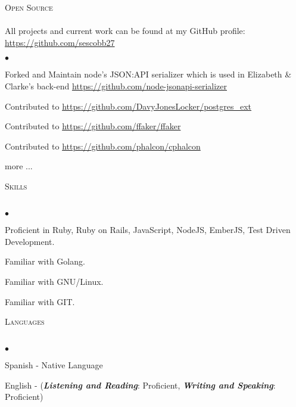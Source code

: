 \documentclass[a4paper]{article}
\newcommand{\lineunder}{\vspace*{-8pt} \\ \hspace*{-18pt} \hrulefill \\}
\newcommand{\header}[1]{{\hspace*{-15pt}\vspace*{6pt}
\textsc{#1}} \vspace*{-6pt} \lineunder}
\newenvironment{achievements}{\begin{list}{$\bullet$}{\topsep 0pt \itemsep
-2pt}}{\vspace*{4pt}\end{list}}
\newcommand{\programming}[1]{{\textbf{#1}}}
\newcommand{\emphasys}[1]{\textbf{\emph{#1}}}
\begin{document}

\header{Open Source}
All projects and current work can be found at my GitHub profile: \url{https://github.com/sescobb27}
\begin{achievements}
\item{Forked and Maintain node's JSON:API serializer which is used in Elizabeth \& Clarke's back-end \url{https://github.com/node-jsonapi-serializer}}
\item{Contributed to \url{https://github.com/DavyJonesLocker/postgres_ext}}
\item{Contributed to \url{https://github.com/ffaker/ffaker}}
\item{Contributed to \url{https://github.com/phalcon/cphalcon}}
\item{more ...}
\end{achievements}

\header{Skills}
\begin{achievements}
\item {Proficient in Ruby, Ruby on Rails, JavaScript, NodeJS, EmberJS, Test Driven Development.}
\item {Familiar with Golang.}
\item {Familiar with GNU/Linux.}
\item {Familiar with GIT.}
\end{achievements}
\header{Languages}
\begin{achievements}
\item{Spanish - Native Language}
\item{English - (\emphasys{Listening and Reading}: Proficient, \emphasys{Writing and Speaking}: Proficient)}
\end{achievements}
\end{document}
